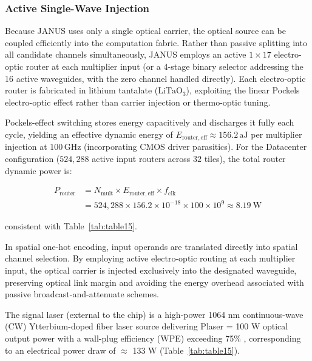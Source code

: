 \documentclass[journal]{IEEEtran}
\begin{document}


\subsubsection{\textbf{Active Single-Wave Injection}}

Because JANUS uses only a single optical carrier, the optical source can be coupled efficiently into the computation fabric. Rather than passive splitting into all candidate channels simultaneously, JANUS employs an active $1 \times 17$ electro-optic router at each multiplier input (or a 4-stage binary selector addressing the 16 active waveguides, with the zero channel handled directly). Each electro-optic router is fabricated in lithium tantalate ($\mathrm{LiTaO_3}$), exploiting the linear Pockels electro-optic effect rather than carrier injection or thermo-optic tuning. 

Pockels-effect switching stores energy capacitively and discharges it fully each cycle, yielding an effective dynamic energy of $E_{\mathrm{router,eff}} \approx 156.2\,\mathrm{aJ}$ per multiplier injection at $100\,\mathrm{GHz}$ (incorporating CMOS driver parasitics). For the Datacenter configuration ($524{,}288$ active input routers across $32$ tiles), the total router dynamic power is:

\begin{equation}
\begin{aligned}
P_{\mathrm{router}} &= N_{\mathrm{mult}} \times E_{\mathrm{router,eff}} \times f_{\mathrm{clk}} \\
&= 524{,}288 \times 156.2 \times 10^{-18} \times 100 \times 10^{9} \approx 8.19~\mathrm{W}
\end{aligned}
\end{equation}

consistent with Table~\ref{tab:table15}.

In spatial one-hot encoding, input operands are translated directly into spatial channel selection. By employing active electro-optic routing at each multiplier input, the optical carrier is injected exclusively into the designated waveguide, preserving optical link margin and avoiding the energy overhead associated with passive broadcast-and-attenuate schemes.

The signal laser (external to the chip) is a high-power 1064 nm continuous-wave (CW) Ytterbium-doped fiber laser source delivering Plaser = 100 W optical output power with a wall-plug efficiency (WPE) exceeding 75\% \cite{Jeong2004}, corresponding to an electrical power draw of $\approx$ 133 W (Table~\ref{tab:table15}). 
\end{document}
